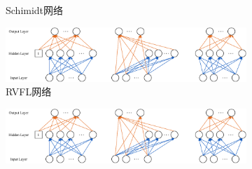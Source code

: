 \begin{frame}
\begin{figure}[H]
\begin{subfigure}[b]{0.25\textwidth}
                \caption{Schimidt网络}
            \end{subfigure}
            \hspace*{0.03\textwidth}
            \begin{subfigure}[b]{0.25\textwidth}
                \includegraphics[height=\linewidth]{float/ch.cnn/rvfl.pdf}
                \caption{RVFL网络}
            \end{subfigure}
            \hspace*{\fill}
            \begin{subfigure}[b]{0.25\textwidth}
                \includegraphics[height=\linewidth]{float/ch.cnn/elm.pdf}

\end{subfigure}
\end{figure}
\end{frame}
